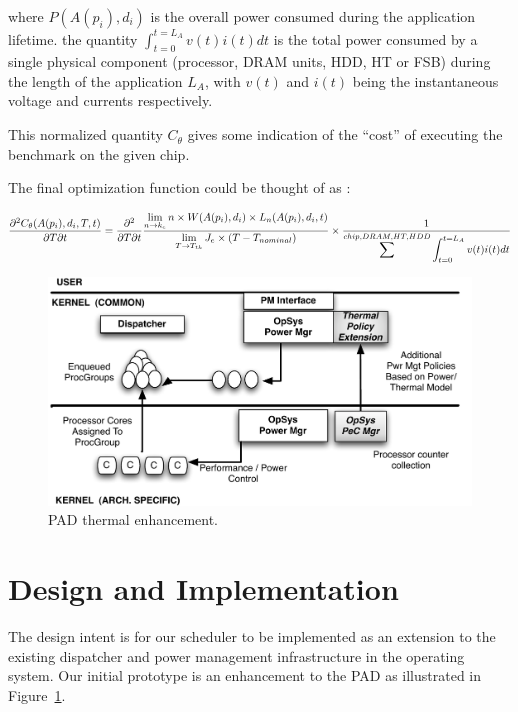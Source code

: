 \documentclass[]{sig-alternate-hotpower09}
\begin{document}
where $P(A(p_i),d_i)$ is the overall power consumed during the
application lifetime. the quantity $\int_{t=0}^{t=L_A}v(t)i(t)dt$ is the
total power consumed by a single physical component (processor, DRAM
units, HDD, HT or FSB) during the length of the application $L_A$, with
$v(t)$ and $i(t)$ being the instantaneous voltage and currents
respectively.

This normalized quantity $C_\theta$ gives some indication of the
``cost'' of executing the benchmark on the given chip.

The final optimization function could be thought of as :

\[
\frac{\partial^2 C_{\theta}(A(p_i), d_i, T, t)}{\partial T \partial t} = \frac{\partial^2}{\partial T \partial t} \frac{\displaystyle \lim_{n \to k_e }n \times W(A(p_i),d_i) \times L_n(A(p_i),d_i,t)}{\displaystyle \lim_{T \to T_{th}} J_e \times (T - T_{nominal})} \\
											       \times \frac{1}{\displaystyle \sum^{chip,DRAM,HT,HDD} \int_{t=0}^{t=L_A}v(t)i(t)dt} 
\]
\begin{figure}[htbp]
  \centering
  \includegraphics[scale=0.40]{schedarch.pdf}
  \caption{PAD thermal enhancement.}
  \label{fig:schdarch}
\end{figure}
\section{Design and Implementation}
\label{sec:design}
The design intent is for our scheduler to be
implemented as an extension to the existing dispatcher and power
management infrastructure in the operating system.  Our initial
prototype is an enhancement to the PAD as illustrated in
Figure~\ref{fig:schdarch}.
\end{document}
